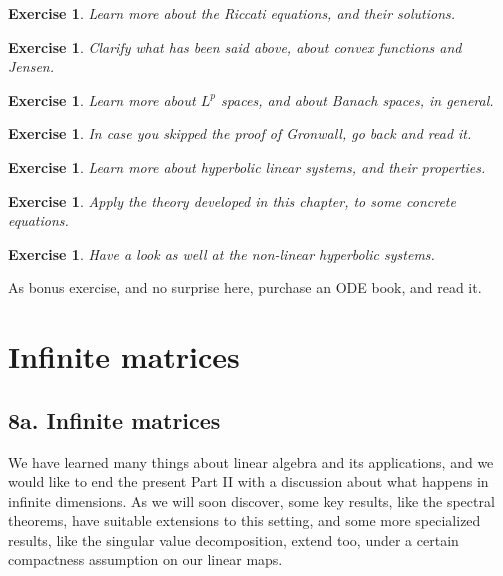 \documentclass[12pt]{amsbook}
\newtheorem{exercise}[theorem]{Exercise}
\begin{document}
\begin{exercise}
Learn more about the Riccati equations, and their solutions.
\end{exercise}

\begin{exercise}
Clarify what has been said above, about convex functions and Jensen.
\end{exercise}

\begin{exercise}
Learn more about $L^p$ spaces, and about Banach spaces, in general.
\end{exercise}

\begin{exercise}
In case you skipped the proof of Gronwall, go back and read it.
\end{exercise}

\begin{exercise}
Learn more about hyperbolic linear systems, and their properties.
\end{exercise}

\begin{exercise}
Apply the theory developed in this chapter, to some concrete equations.
\end{exercise}

\begin{exercise}
Have a look as well at the non-linear hyperbolic systems.
\end{exercise}

As bonus exercise, and no surprise here, purchase an ODE book, and read it.

\chapter{Infinite matrices}

\section*{8a. Infinite matrices}

We have learned many things about linear algebra and its applications, and we would like to end the present Part II with a discussion about what happens in infinite dimensions. As we will soon discover, some key results, like the spectral theorems, have suitable extensions to this setting, and some more specialized results, like the singular value decomposition, extend too, under a certain compactness assumption on our linear maps.

\bigskip
\end{document}
